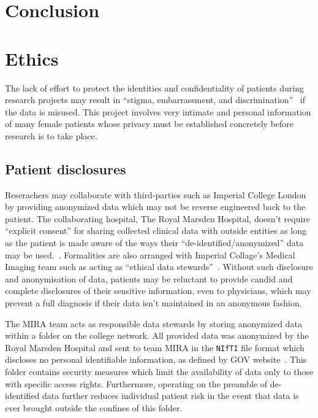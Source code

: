 \documentclass[12pt,twoside]{report}
\begin{document}
\chapter{Conclusion}

\chapter{Ethics}

The lack of effort to protect the identities and confidentiality of patients during research projects may result in ``stigma, embarrassment, and discrimination''~\cite{health-privacy} if the data is misused.
This project involves very intimate and personal information of many female patients whose privacy must be established concretely before research is to take place.%

\section{Patient disclosures}

Reserachers may collaborate with third-parties such as Imperial College London by providing anonymized data which may not be reverse engineered back to the patient. The collaborating hospital, The Royal Marsden Hospital, doesn't require ``explicit consent'' for sharing collected clinical data with outside entities as long as the patient is made aware of the ways their ``de-identified/anonymized'' data may be used.~\cite{royal-marsden-privacy-note}. Formalities are also arranged with Imperial Collage's Medical Imaging team such as acting as ``ethical data stewards''~\cite{Larson2020-ib}. Without such disclosure and anonymisation of data, patients may be reluctant to provide candid and complete disclosures of their sensitive information, even to physicians, which may prevent a full diagnosis if their data isn't maintained in an anonymous fashion.

The MIRA team acts as responsible data stewards by storing anonymized data within a folder on the college network. All provided data was anonymized by the Royal Marsden Hospital and sent to team MIRA in the \texttt{NIfTI} file format which discloses no personal identifiable information, as defined by GOV website~\cite{gov-gdpr}. This folder contains security measures which limit the availability of data only to those with specific access rights. Furthermore, operating on the preamble of de-identified data further reduces individual patient risk in the event that data is ever brought outside the confines of this folder.
\end{document}
